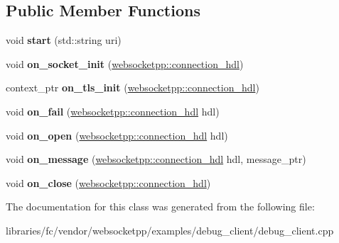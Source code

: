 \subsection*{Public Member Functions}
\begin{DoxyCompactItemize}
\item 
\mbox{\label{classperftest_afa86f15f51139add01d21a1cc1b42d8a}} 
void {\bfseries start} (std\+::string uri)
\item 
\mbox{\label{classperftest_aca420618efac42bcafa8f582fc80584b}} 
void {\bfseries on\+\_\+socket\+\_\+init} (\mbox{\hyperlink{namespacewebsocketpp_a6b3d26a10ee7229b84b776786332631d}{websocketpp\+::connection\+\_\+hdl}})
\item 
\mbox{\label{classperftest_a9acaf6688b55a4c341609f36a3daf47a}} 
context\+\_\+ptr {\bfseries on\+\_\+tls\+\_\+init} (\mbox{\hyperlink{namespacewebsocketpp_a6b3d26a10ee7229b84b776786332631d}{websocketpp\+::connection\+\_\+hdl}})
\item 
\mbox{\label{classperftest_aa3802566f897c99564008e301a56fc99}} 
void {\bfseries on\+\_\+fail} (\mbox{\hyperlink{namespacewebsocketpp_a6b3d26a10ee7229b84b776786332631d}{websocketpp\+::connection\+\_\+hdl}} hdl)
\item 
\mbox{\label{classperftest_a55d1e404c7a1e57b27dbb9b16cd72fbc}} 
void {\bfseries on\+\_\+open} (\mbox{\hyperlink{namespacewebsocketpp_a6b3d26a10ee7229b84b776786332631d}{websocketpp\+::connection\+\_\+hdl}} hdl)
\item 
\mbox{\label{classperftest_a7806f56e172fe624849f4df473b1bb18}} 
void {\bfseries on\+\_\+message} (\mbox{\hyperlink{namespacewebsocketpp_a6b3d26a10ee7229b84b776786332631d}{websocketpp\+::connection\+\_\+hdl}} hdl, message\+\_\+ptr)
\item 
\mbox{\label{classperftest_a3394af04525712135cd6795c4778b882}} 
void {\bfseries on\+\_\+close} (\mbox{\hyperlink{namespacewebsocketpp_a6b3d26a10ee7229b84b776786332631d}{websocketpp\+::connection\+\_\+hdl}})
\end{DoxyCompactItemize}


The documentation for this class was generated from the following file\+:\begin{DoxyCompactItemize}
\item 
libraries/fc/vendor/websocketpp/examples/debug\+\_\+client/debug\+\_\+client.\+cpp\end{DoxyCompactItemize}
